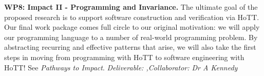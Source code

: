 \documentclass[a4paper,11pt]{article}
\begin{document}






{\bf WP8: Impact II - Programming and Invariance.} The ultimate goal
of the proposed research is to support software construction and
verification via HoTT. Our final work package comes full circle to our
original motivation: we will apply our programming language to a
number of real-world programming problem. By abstracting recurring and effective
patterns that arise, we will also take the first steps in moving from
programming with HoTT to software engineering with HoTT! See {\em
  Pathways to Impact}. {\em Deliverable: ,Collaborator: Dr A Kennedy} 
\end{document}

